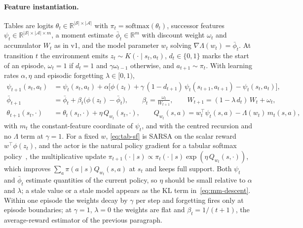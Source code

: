 \documentclass[11pt]{article}
\theoremstyle{remark}
\newcommand{\Acal}{\mathcal A}
\newcommand{\Scal}{\mathcal S}
\newcommand{\1}{\mathds{1}}
\newcommand{\KL}{\mathrm{KL}}
\begin{document}
\paragraph{Feature instantiation.}
Tables are logits $\theta_t\in\mathbb R^{|\Scal|\times|\Acal|}$ with $\pi_t=\mathrm{softmax}(\theta_t)$, successor features $\psi_t\in\mathbb R^{|\Scal|\times|\Acal|\times m}$, a moment estimate $\bar\phi_t\in\mathbb R^m$ with discount weight $\omega_t$ and accumulator $W_t$ as in v1, and the model parameter $w_t$ solving $\nabla\Lambda(w_t)=\bar\phi_t$.
At transition $t$ the environment emits $z_t\sim K(\cdot\mid s_t,a_t)$, $d_t\in\{0,1\}$ marks the start of an episode, $\omega_t=1$ if $d_t=1$ and $\gamma\omega_{t-1}$ otherwise, and $a_{t+1}\sim\pi_t$.
With learning rates $\alpha,\eta$ and episodic forgetting $\lambda\in[0,1)$,
\begin{align}
  \psi_{t+1}(s_t,a_t) &= \psi_t(s_t,a_t)+\alpha\big[\phi(z_t)+\gamma\,(1-d_{t+1})\,\psi_t(s_{t+1},a_{t+1})-\psi_t(s_t,a_t)\big],
  \label{eq:tab-sf}\\
  \bar\phi_{t+1} &= \bar\phi_t+\beta_t\big(\phi(z_t)-\bar\phi_t\big),
  \qquad \beta_t=\frac{\omega_t}{W_{t+1}},
  \qquad W_{t+1}=(1-\lambda\,d_t)\,W_t+\omega_t,
  \label{eq:tab-w}\\
  \theta_{t+1}(s_t,\cdot) &= \theta_t(s_t,\cdot)+\eta\,Q_{w_t}(s_t,\cdot),
  \qquad
  Q_{w_t}(s,a)=w_t^\top\psi_t(s,a)-\Lambda(w_t)\,m_t(s,a) ,
  \label{eq:tab-pi}
\end{align}
with $m_t$ the constant-feature coordinate of $\psi_t$, and with the centred recursion and no $\Lambda$ term at $\gamma=1$.
For a fixed $w$, \eqref{eq:tab-sf} is SARSA on the scalar reward $w^\top\phi(z_t)$, and the actor is the natural policy gradient for a tabular softmax policy~\citep{Kakade-natural01,Agarwal-theory21}, the multiplicative update $\pi_{t+1}(\cdot\mid s)\propto\pi_t(\cdot\mid s)\exp(\eta\,Q_{w_t}(s,\cdot))$, which improves $\sum_a\pi(a\mid s)Q_{w_t}(s,a)$ at $s_t$ and keeps full support.
Both $\psi_t$ and $\bar\phi_t$ estimate quantities of the current policy, so $\eta$ should be small relative to $\alpha$ and $\lambda$; a stale value or a stale model appears as the $\KL$ term in~\eqref{eq:mm-descent}.
Within one episode the weights decay by $\gamma$ per step and forgetting fires only at episode boundaries; at $\gamma=1$, $\lambda=0$ the weights are flat and $\beta_t=1/(t+1)$, the average-reward estimator of the previous paragraph.
\end{document}
